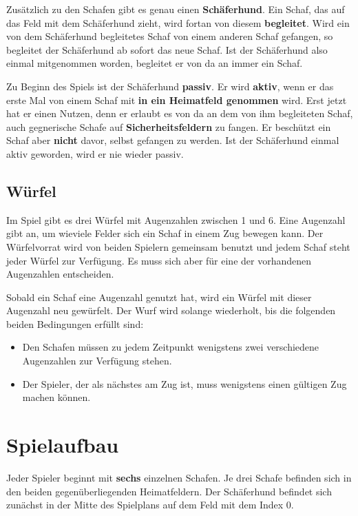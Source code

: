 \documentclass[11pt,pointlessnumbers,DIV10,BCOR10mm,tocleft]{scrreprt}
\begin{document}
Zusätzlich zu den Schafen gibt es genau einen \textbf{Schäferhund}. Ein Schaf, das auf das Feld mit dem Schäferhund zieht, wird fortan von diesem \textbf{begleitet}. Wird ein von dem Schäferhund begleitetes Schaf von einem anderen Schaf gefangen, so begleitet der Schäferhund ab sofort das neue Schaf. Ist der Schäferhund also einmal mitgenommen worden, begleitet er von da an immer ein Schaf.

Zu Beginn des Spiels ist der Schäferhund \textbf{passiv}. Er wird \textbf{aktiv}, wenn er das erste Mal von einem Schaf mit \textbf{in ein Heimatfeld genommen} wird. Erst jetzt hat er einen Nutzen, denn er erlaubt es von da an dem von ihm begleiteten Schaf, auch gegnerische Schafe auf \textbf{Sicherheitsfeldern} zu fangen. Er beschützt ein Schaf aber \textbf{nicht} davor, selbst gefangen zu werden. Ist der Schäferhund einmal aktiv geworden, wird er nie wieder passiv.

\subsection{Würfel}
Im Spiel gibt es drei Würfel mit Augenzahlen zwischen 1 und 6. Eine Augenzahl gibt an, um wieviele Felder sich ein Schaf in einem Zug bewegen kann. Der Würfelvorrat wird von beiden Spielern gemeinsam benutzt und jedem Schaf steht jeder Würfel zur Verfügung. Es muss sich aber für eine der vorhandenen Augenzahlen entscheiden. 

Sobald ein Schaf eine Augenzahl genutzt hat, wird ein Würfel mit dieser Augenzahl neu gewürfelt. Der Wurf wird solange wiederholt, bis die folgenden beiden Bedingungen erfüllt sind:

\begin{itemize}
\item Den Schafen müssen zu jedem Zeitpunkt wenigstens zwei verschiedene Augenzahlen zur Verfügung stehen.
\item Der Spieler, der als nächstes am Zug ist, muss wenigstens einen gültigen Zug machen können.
\end{itemize}
 
\section{Spielaufbau}
Jeder Spieler beginnt mit \textbf{sechs} einzelnen Schafen. Je drei Schafe befinden sich in den beiden gegenüberliegenden Heimatfeldern. Der Schäferhund befindet sich zunächst in der Mitte des Spielplans auf dem Feld mit dem Index 0.
\end{document}
